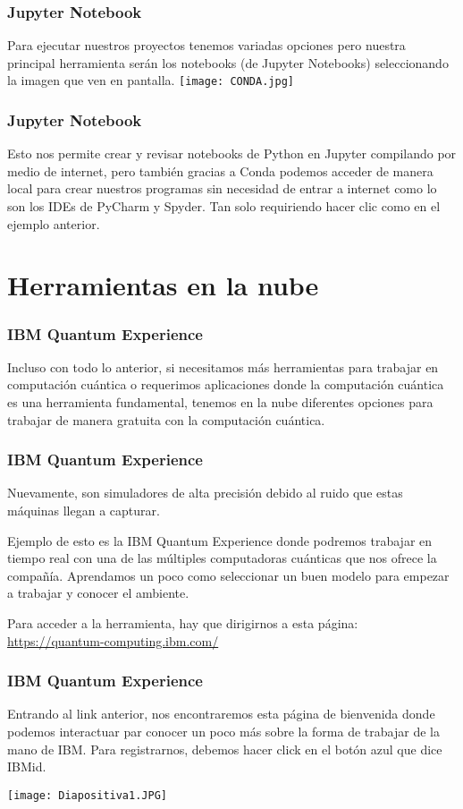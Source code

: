 \documentclass[spanish]{beamer}
\begin{document}
       
 \newpage\setlength{\parskip}{1mm}
 \begin{frame}[fragile]
 \frametitle{Jupyter Notebook} 
 \justify 
 Para ejecutar nuestros proyectos tenemos variadas opciones pero nuestra principal herramienta serán los notebooks (de Jupyter Notebooks) seleccionando la imagen que ven en pantalla.
\centering\texttt{[image: CONDA.jpg]}
\end{frame}

 \newpage\setlength{\parskip}{1mm}
 \begin{frame}[fragile]
 \frametitle{Jupyter Notebook} 
 \justify 
Esto nos permite crear y revisar notebooks de Python en Jupyter compilando por medio de internet, pero también gracias a Conda podemos acceder de manera local para crear nuestros programas sin necesidad de entrar a internet como lo son los IDEs de PyCharm y Spyder. Tan solo requiriendo hacer clic como en el ejemplo anterior.
\end{frame}

\section{Herramientas en la nube}        
 \setlength{\parskip}{1mm}
 \begin{frame}[fragile]
 \frametitle{IBM Quantum Experience} 
 \justify    
 Incluso con todo lo anterior, si necesitamos más herramientas para trabajar en computación cuántica o requerimos aplicaciones donde la computación cuántica es una herramienta fundamental, tenemos en la nube diferentes opciones para trabajar de manera gratuita con la computación cuántica. 
  \end{frame}
 \newpage \setlength{\parskip}{1mm}
 \begin{frame}[fragile]
 \frametitle{IBM Quantum Experience} 
 \justify   
 Nuevamente, son simuladores de alta precisión debido al ruido que estas máquinas llegan a capturar.
 
 Ejemplo de esto es la IBM Quantum Experience donde podremos trabajar en tiempo real con una de las múltiples computadoras cuánticas que nos ofrece la compañía. Aprendamos un poco como seleccionar un buen modelo para empezar a trabajar y conocer el ambiente.
 
 Para acceder a la herramienta, hay que dirigirnos a esta página:  \url{https://quantum-computing.ibm.com/}

 \end{frame}
 
 \newpage\begin{frame}
 \frametitle{IBM Quantum Experience} 
 \justify 
Entrando al link anterior, nos encontraremos esta página de bienvenida donde podemos interactuar par conocer un poco más sobre la forma de trabajar de la mano de IBM. Para registrarnos, debemos hacer click en el botón azul que dice IBMid.
 
 \centering\texttt{[image: Diapositiva1.JPG]}
 \end{frame}
 
\end{document}
